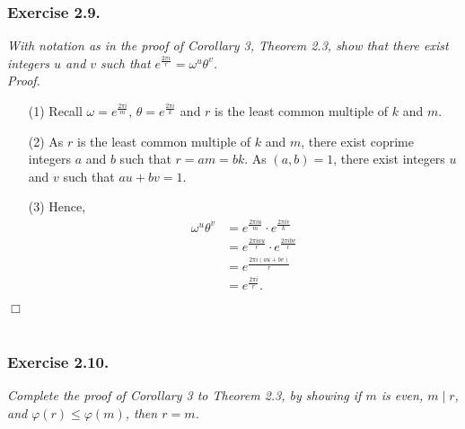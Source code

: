 \documentclass{article}
\begin{document}



\subsubsection*{Exercise 2.9.}
\emph{With notation as in the proof of Corollary 3, Theorem 2.3,
show that there exist integers $u$ and $v$ such that
$e^{\frac{2\pi i}{r}} = \omega^u \theta^v$.} \\



\emph{Proof.}
\begin{enumerate}
\item[(1)]
  Recall $\omega = e^{\frac{2\pi i}{m}}$, $\theta = e^{\frac{2\pi i}{k}}$
  and $r$ is the least common multiple of $k$ and $m$.

\item[(2)]
  As $r$ is the least common multiple of $k$ and $m$,
  there exist coprime integers $a$ and $b$ such that $r = am = bk$.
  As $(a,b) = 1$, there exist integers $u$ and $v$ such that $au + bv = 1$.

\item[(3)]
  Hence,
  \begin{align*}
    \omega^u \theta^v
    &= e^{\frac{2\pi i u}{m}} \cdot e^{\frac{2\pi i v}{k}} \\
    &= e^{\frac{2\pi i au}{r}} \cdot e^{\frac{2\pi i bv}{r}} \\
    &= e^{\frac{2\pi i (au+bv)}{r}} \\
    &= e^{\frac{2\pi i}{r}}.
  \end{align*}
\end{enumerate}
$\Box$ \\\\






\subsubsection*{Exercise 2.10.}
\emph{Complete the proof of Corollary 3 to Theorem 2.3,
by showing if $m$ is even, $m \mid r$, and $\varphi(r) \leq \varphi(m)$, then $r = m$.} \\
\end{document}
